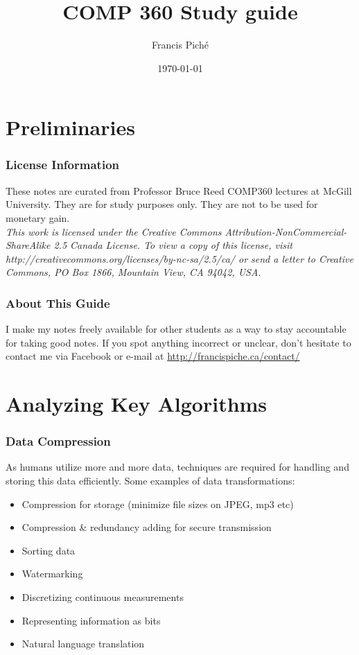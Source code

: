 \documentclass[12pt]{article}
\theoremstyle{definition}
\begin{document}
\title{COMP 360 Study guide}
\author{Francis Pich\'e}
\date{\today}
\maketitle
\newpage
\tableofcontents
\newpage

\part{Preliminaries}
\section{License Information}
These notes are curated from Professor Bruce Reed COMP360 lectures at McGill University. They are for study purposes only. They are not to be used for monetary gain.
\\ \linebreak
\textit{This work is licensed under the Creative Commons Attribution-NonCommercial-ShareAlike 2.5 Canada License. To view a copy of this license, visit http://creativecommons.org/licenses/by-nc-sa/2.5/ca/ or send a letter to Creative Commons, PO Box 1866, Mountain View, CA 94042, USA.}
\section{About This Guide}
I make my notes freely available for other students as a way to stay accountable for taking good notes. If you spot anything incorrect or unclear, don't hesitate to contact me via Facebook or e-mail at \url{http://francispiche.ca/contact/}

\part{Analyzing Key Algorithms}
\section{Data Compression}
As humans utilize more and more data, techniques are required for handling and storing this data efficiently. Some examples of data transformations:
\begin{itemize}
	\item Compression for storage (minimize file sizes on JPEG, mp3 etc)
	\item Compression \& redundancy adding for secure transmission
	\item Sorting data
	\item Watermarking
	\item Discretizing continuous measurements
	\item Representing information as bits
	\item Natural language translation
\end{itemize}
\end{document}

